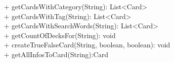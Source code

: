 { 
    + getCardsWithCategory(String): List<Card> \\ 
    + getCardsWithTag(String): List<Card> \\ 
    + getCardsWithSearchWords(String): List<Card> \\ 
    + getCountOfDecksFor(String): void\\
    + createTrueFalseCard(String, boolean, boolean): void \\
    + getAllInfosToCard(String):Card\\
}{}